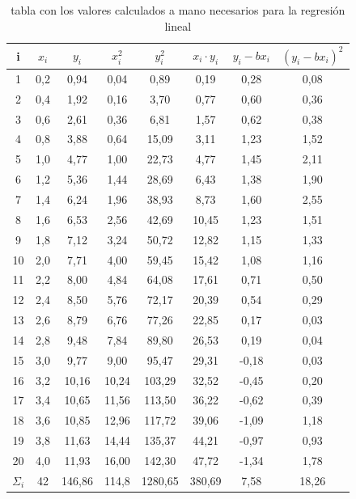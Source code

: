 \documentclass[12pt,a4paper]{book}
\begin{document}
\newpage


\vspace*{1.5cm} 

\begin{table}[h!]
\begin{center}
\begin{tabular}{|c|c|c|c|c|c|c|c|}
\hline 
i & 	 $x_i$ & 	 $y_i$ & 	 $x_i^2$ & 	 $y_i^2$ & 	 $x_i \cdot y_i$ & 	 $ y_i-bx_i $ & 	 $(y_i-bx_i)^2$
  	\\  \hline
1 & 	 0,2 & 	 0,94 & 	 0,04 & 	 0,89 & 	 0,19 & 	 0,28 & 	 0,08
  	\\ 
2 & 	 0,4 & 	 1,92 & 	 0,16 & 	 3,70 & 	 0,77 & 	 0,60 & 	 0,36
  	\\ 
3 & 	 0,6 & 	 2,61 & 	 0,36 & 	 6,81 & 	 1,57 & 	 0,62 & 	 0,38
  	\\ 
4 & 	 0,8 & 	 3,88 & 	 0,64 & 	 15,09 & 	 3,11 & 	 1,23 & 	 1,52
  	\\ 
5 & 	 1,0 & 	 4,77 & 	 1,00 & 	 22,73 & 	 4,77 & 	 1,45 & 	 2,11
  	\\ 
6 & 	 1,2 & 	 5,36 & 	 1,44 & 	 28,69 & 	 6,43 & 	 1,38 & 	 1,90
  	\\ 
7 & 	 1,4 & 	 6,24 & 	 1,96 & 	 38,93 & 	 8,73 & 	 1,60 & 	 2,55
  	\\ 
8 & 	 1,6 & 	 6,53 & 	 2,56 & 	 42,69 & 	 10,45 & 	 1,23 & 	 1,51
  	\\ 
9 & 	 1,8 & 	 7,12 & 	 3,24 & 	 50,72 & 	 12,82 & 	 1,15 & 	 1,33
  	\\ 
10 & 	 2,0 & 	 7,71 & 	 4,00 & 	 59,45 & 	 15,42 & 	 1,08 & 	 1,16
  	\\ 
11 & 	 2,2 & 	 8,00 & 	 4,84 & 	 64,08 & 	 17,61 & 	 0,71 & 	 0,50
  	\\ 
12 & 	 2,4 & 	 8,50 & 	 5,76 & 	 72,17 & 	 20,39 & 	 0,54 & 	 0,29
  	\\ 
13 & 	 2,6 & 	 8,79 & 	 6,76 & 	 77,26 & 	 22,85 & 	 0,17 & 	 0,03
  	\\ 
14 & 	 2,8 & 	 9,48 & 	 7,84 & 	 89,80 & 	 26,53 & 	 0,19 & 	 0,04
  	\\ 
15 & 	 3,0 & 	 9,77 & 	 9,00 & 	 95,47 & 	 29,31 & 	 -0,18 & 	 0,03
  	\\ 
16 & 	 3,2 & 	 10,16 & 	 10,24 & 	 103,29 & 	 32,52 & 	 -0,45 & 	 0,20
  	\\ 
17 & 	 3,4 & 	 10,65 & 	 11,56 & 	 113,50 & 	 36,22 & 	 -0,62 & 	 0,39
  	\\ 
18 & 	 3,6 & 	 10,85 & 	 12,96 & 	 117,72 & 	 39,06 & 	 -1,09 & 	 1,18
  	\\ 
19 & 	 3,8 & 	 11,63 & 	 14,44 & 	 135,37 & 	 44,21 & 	 -0,97 & 	 0,93
  	\\ 
20 & 	 4,0 & 	 11,93 & 	 16,00 & 	 142,30 & 	 47,72 & 	 -1,34 & 	 1,78
  	\\  \hline
$\Sigma _i$ & 	 42 & 	 146,86 & 	 114,8 & 	 1280,65 & 	 380,69 & 	 7,58 & 	 18,26
  	\\ 
\hline 
\end{tabular}
\end{center}
\caption{tabla con los valores calculados a mano necesarios para la regresión lineal}
\end{table}
\end{document}

